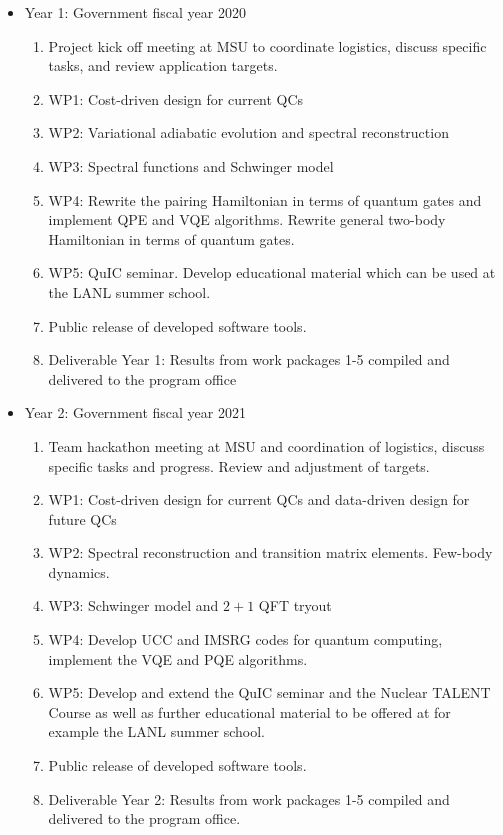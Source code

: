 \documentclass[11pt]{article}
\begin{document}
\begin{itemize}
    \item Year 1: Government fiscal year 2020
    \begin{enumerate}
        \item Project kick off meeting at MSU to coordinate logistics, discuss
specific tasks, and review application targets.
\item WP1: Cost-driven design for current QCs
\item WP2: Variational adiabatic evolution and spectral reconstruction
\item WP3: Spectral functions and Schwinger model
\item WP4: Rewrite the pairing Hamiltonian in terms of quantum gates and implement QPE and VQE algorithms. Rewrite general two-body Hamiltonian in terms of quantum gates. 
\item WP5:  QuIC seminar. Develop educational material which can be used at the LANL summer school.
\item Public release of developed software tools.
\item Deliverable Year 1: Results from work packages 1-5 compiled and delivered to the program office
    \end{enumerate}
    \item Year 2: Government fiscal year 2021
    \begin{enumerate}
        \item Team hackathon meeting at MSU and coordination of logistics, discuss specific tasks and progress. Review and adjustment of targets.
        \item WP1: Cost-driven design for current QCs and data-driven design for future QCs 
\item WP2: Spectral reconstruction and transition matrix elements. Few-body dynamics.
\item WP3: Schwinger model and $2+1$ QFT tryout
\item WP4: Develop UCC and IMSRG codes for quantum computing, implement the VQE and PQE algorithms.
\item WP5: Develop and extend the QuIC seminar and the Nuclear TALENT Course as well as further educational material to be offered at for example the LANL summer school.
\item Public release of developed software tools.
\item Deliverable Year 2: Results from work packages 1-5 compiled and delivered to the program office.
    \end{enumerate}

\end{itemize}
\end{document}
